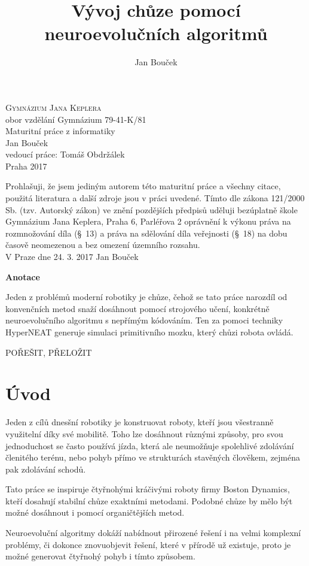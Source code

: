 \documentclass[a4]{article}
\begin{document}
 
 
\begin{titlepage} 
\begin{center} 
{\Huge\textsc{Gymnázium Jana Keplera}\\} 
{\large{obor vzdělání Gymnázium 79-41-K/81}\\[0.7cm]} 
{\huge{Maturitní práce z informatiky}\\[0.5cm]} 
{\Large{Jan Bouček}\\} 
{\large{vedoucí práce: Tomáš Obdržálek}\\} 
{\large{Praha 2017}} 
\end{center} 
\end{titlepage} 
 
\newpage 
Prohlašuji, že jsem jediným autorem této maturitní práce a všechny citace, použitá literatura a další zdroje jsou v práci uvedené. Tímto dle zákona 121/2000 Sb. (tzv. Autorský zákon) ve znění pozdějších předpisů uděluji bezúplatně škole Gymnázium Jana Keplera, Praha 6, Parléřova 2 oprávnění k výkonu práva na rozmnožování díla (§~13) a práva na sdělování díla veřejnosti (§~18) na dobu časově neomezenou a bez omezení územního rozsahu.\\[0.7cm] 
\vspace{10cm} 
{\large{V Praze dne 24. 3. 2017} \hfill Jan Bouček} 
\newpage 
{\Large\textbf{Anotace}\par}
Jeden z problémů moderní robotiky je chůze, čehož se tato práce narozdíl od konvenčních metod snaží dosáhnout pomocí strojového učení, konkrétně neuroevolučního algoritmu s nepřímým kódováním. Ten za pomoci techniky HyperNEAT generuje simulaci primitivního mozku, který chůzi robota ovládá.\par 
 
{\Huge{POŘEŠIT, PŘELOŽIT}} 
\title{Vývoj chůze pomocí neuroevolučních algoritmů} 
\author{Jan Bouček} 
\date{} 
\maketitle 
 
\section{Úvod} 
Jeden z cílů dnesšní robotiky je konstruovat roboty, kteří jsou všestranně využitelní díky své mobilitě. Toho lze dosáhnout různými způsoby, pro svou jednoduchost se často používá jízda, která ale neumožňuje spolehlivé zdolávání členitého terénu, nebo pohyb přímo ve strukturách stavěných člověkem, zejména pak zdolávání schodů.\par
Tato práce se inspiruje čtyřnohými kráčivými roboty firmy Boston Dynamics, kteří dosahují stabilní chůze exaktními metodami. Podobné chůze by mělo být možné dosáhnout i pomocí organičtějších metod.\par
Neuroevoluční algoritmy dokáží nabídnout přirozené řešení i na velmi komplexní problémy, či dokonce znovuobjevit řešení, které v přírodě už existuje, proto je možné generovat čtyřnohý pohyb i tímto způsobem.\par 
 
\end{document}
